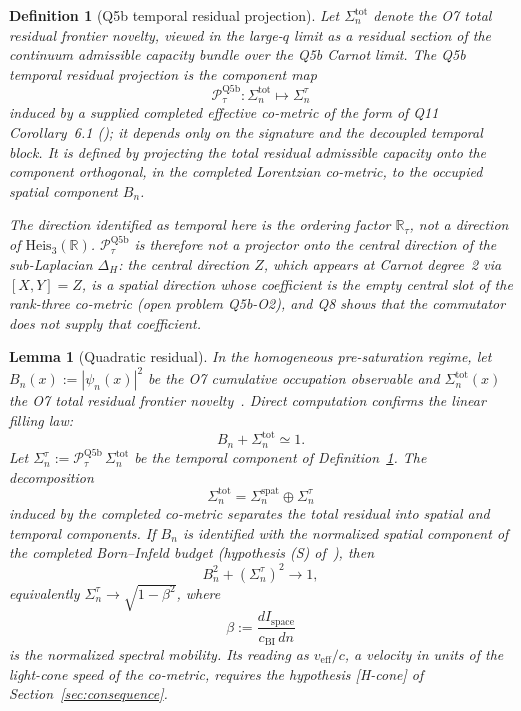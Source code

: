 \documentclass[11pt]{article}
\newtheorem{lemma}{Lemma}
\newtheorem{definition}[theorem]{Definition}
\begin{document}
    \begin{definition}[Q5b temporal residual projection]
      \label{def:q5b-temporal-projection}
      Let $\Sigma_n^{\mathrm{tot}}$ denote the O7 total residual frontier novelty,
      viewed in the large-$q$ limit as a residual section of the continuum
      admissible capacity bundle over the Q5b Carnot limit.
      The Q5b temporal residual projection is the component map
      \[
        \mathcal{P}_\tau^{\mathrm{Q5b}} : \Sigma_n^{\mathrm{tot}} \mapsto \Sigma_n^\tau
      \]
      induced by a supplied completed effective co-metric of the form of Q11 Corollary~6.1
      (\cite{Beau2026q5b,Beau2026q11}); it depends only on the signature and the decoupled temporal block.
      It is defined by projecting the total residual admissible capacity onto the
      component orthogonal, in the completed Lorentzian co-metric, to the occupied
      spatial component $B_n$.

      The direction identified as \emph{temporal} here is the ordering factor $\mathbb{R}_\tau$, not a
      direction of $\mathrm{Heis}_3(\mathbb{R})$.
      $\mathcal{P}_\tau^{\mathrm{Q5b}}$ is therefore \emph{not} a projector onto the central direction of the
      sub-Laplacian $\Delta_H$: the central direction $Z$, which appears at Carnot degree~2 via $[X,Y]=Z$, is a
      spatial direction whose coefficient is the empty central slot of the rank-three co-metric (open problem
      Q5b-O2), and Q8 shows that the commutator does not supply that coefficient.
    \end{definition}

    \begin{lemma}[Quadratic residual]
      \label{lem:main}
      In the homogeneous pre-saturation regime, let $B_n(x) := |\psi_n(x)|^2$
      be the O7 cumulative occupation observable and $\Sigma_n^{\mathrm{tot}}(x)$
      the O7 total residual frontier novelty~\cite{Beau2026a11}.
      Direct computation confirms the linear filling law:
      \[
        B_n + \Sigma_n^{\mathrm{tot}} \simeq 1.
      \]
      Let $\Sigma_n^\tau := \mathcal{P}_\tau^{\mathrm{Q5b}}\,\Sigma_n^{\mathrm{tot}}$
      be the temporal component of Definition~\ref{def:q5b-temporal-projection}.
      The decomposition
      \[
        \Sigma_n^{\mathrm{tot}} = \Sigma_n^{\mathrm{spat}} \oplus \Sigma_n^\tau
      \]
      induced by the completed co-metric separates the total residual into spatial
      and temporal components.
      If $B_n$ is identified with the normalized spatial component of the completed Born--Infeld budget
      (hypothesis (S) of~\cite{Beau2026tp}), then
      \[
        B_n^2 + (\Sigma_n^\tau)^2 \longrightarrow 1,
      \]
      equivalently $\Sigma_n^\tau \to \sqrt{1-\beta^2}$, where
      \[
        \beta := \frac{dI_{\mathrm{space}}}{c_{\mathrm{BI}}\,dn}
      \]
      is the normalized spectral mobility.
      Its reading as $v_{\mathrm{eff}}/c$, a velocity in units of the light-cone speed of the co-metric, requires
      the hypothesis [H-cone] of Section~\ref{sec:consequence}.
    \end{lemma}
\end{document}
